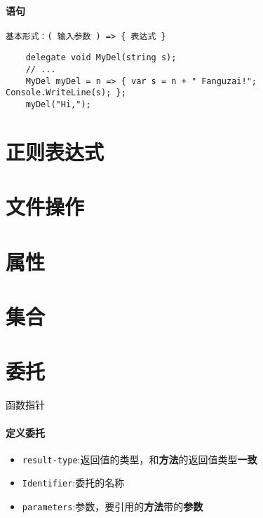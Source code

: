 \documentclass[UTF8,a4paper,12pt]{ctexbook}
\begin{document}
		\paragraph{语句}
			\verb|基本形式：( 输入参数 ) => { 表达式 }|
			\begin{lstlisting}
	delegate void MyDel(string s);  
	// ...
	MyDel myDel = n => { var s = n + " Fanguzai!"; Console.WriteLine(s); };  
	myDel("Hi,");  
			\end{lstlisting}
		
		\paragraph{}	
			
	\section{正则表达式}
	
	\section{文件操作}
	
	\section{属性}
	
	\section{集合}

	\newpage
 	\section{委托}
 		函数指针
 		\paragraph{定义委托} 
 			\begin{itemize}
 				\item \verb|result-type|:返回值的类型，和\textbf{方法}的返回值类型\textbf{一致}
 				\item \verb|Identifier|:委托的名称
 				\item \verb|parameters|:参数，要引用的\textbf{方法}带的\textbf{参数}
 			\end{itemize}
 			
		 
\end{document}
